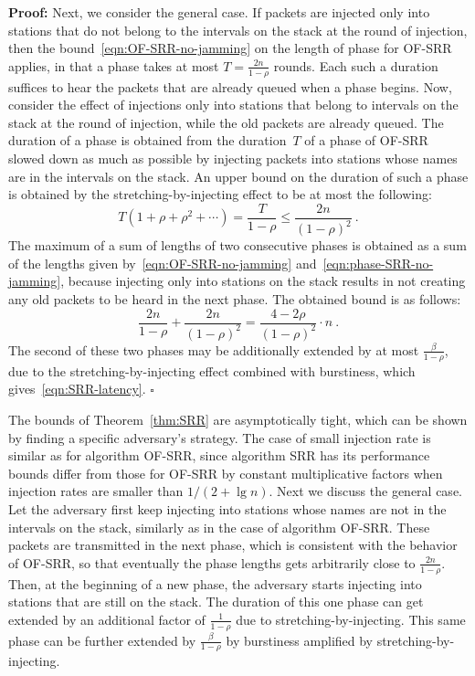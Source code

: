 \documentclass[11pt]{article}
\newcommand{\qed}{\hfill $\square$}
\newenvironment{proof}{\noindent\textbf{Proof: }}{\qed \smallbreak}
\begin{document}
\begin{proof}
Next, we consider the general case.
If packets are injected only into stations that do not belong to the intervals on the stack at the round of injection, then the bound~\eqref{eqn:OF-SRR-no-jamming} on the length of phase for \textsc{OF-SRR} applies, in that a phase takes at most $T=\frac{2n}{1-\rho}$ rounds.
Each such a duration suffices to hear the packets that are already queued when a phase begins.
Now, consider the effect of injections only into stations that belong to intervals on the stack at the round of injection, while the old packets are already queued.
The duration of a phase is obtained from the duration~$T$ of a phase of \textsc{OF-SRR} slowed down as much as possible by injecting packets into stations whose names are in the intervals on the stack.
An upper bound on the duration of such a phase is obtained by the stretching-by-injecting effect to be at most the following:
\begin{equation}
\label{eqn:phase-SRR-no-jamming}
T(1+\rho + \rho^2+\cdots)=\frac{T}{1-\rho}\le \frac{2n}{(1-\rho)^2}
\ .
\end{equation}
The maximum of a sum of lengths of two consecutive phases is obtained as a sum of the lengths given by~\eqref{eqn:OF-SRR-no-jamming} and~\eqref{eqn:phase-SRR-no-jamming}, because injecting only into stations on the stack results in not creating any old packets to be heard in the next phase.
The obtained bound is as follows:
\[
\frac{2n}{1-\rho} + \frac{2n}{(1-\rho)^2} = \frac{4-2\rho}{(1-\rho)^2}\cdot n
\ .
\]
The second of these two phases may be additionally extended by at most  $\frac{\beta}{1-\rho}$,  due to the stretching-by-injecting effect combined with burstiness, which gives~\eqref{eqn:SRR-latency}.
\end{proof}



The bounds of Theorem~\ref{thm:SRR} are asymptotically tight, which can be shown by finding a specific adversary's strategy.
The case of small injection rate is similar as for algorithm \textsc{OF-SRR}, since algorithm \textsc{SRR} has its performance bounds differ from those for \textsc{OF-SRR} by constant multiplicative factors when injection rates are smaller than $1/(2+\lg n)$.
Next we discuss the general case.
Let the adversary first keep injecting into stations whose names are not in the intervals on the stack, similarly as in the case of algorithm \textsc{OF-SRR}.
These packets are transmitted in the next phase, which is consistent with the behavior of \textsc{OF-SRR}, so that eventually the phase lengths gets arbitrarily close to $\frac{2n}{1-\rho}$.
Then, at the beginning of a new phase, the adversary starts injecting into stations that are still on the stack.
The duration of this one phase can get extended by an additional factor of $\frac{1}{1-\rho}$ due to  stretching-by-injecting.
This same phase can be further extended by $\frac{\beta}{1-\rho}$ by burstiness amplified by stretching-by-injecting.
\end{document}
